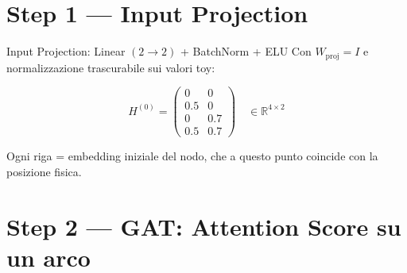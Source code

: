 \documentclass[11pt,a4paper]{article}
\begin{document}
\section*{Step 1 --- Input Projection}

\begin{stepbox}{Input Projection: Linear $(2\!\to\!2)$ + BatchNorm + ELU}
Con $W_{\text{proj}} = I$ e normalizzazione trascurabile sui valori toy:

\[
H^{(0)} = \begin{pmatrix}0 & 0\\0.5 & 0\\0 & 0.7\\0.5 & 0.7\end{pmatrix}
\quad\in\mathbb{R}^{4\times 2}
\]

Ogni riga = embedding iniziale del nodo, che a questo punto coincide con la posizione fisica.
\end{stepbox}

\section*{Step 2 --- GAT: Attention Score su un arco}
\end{document}
